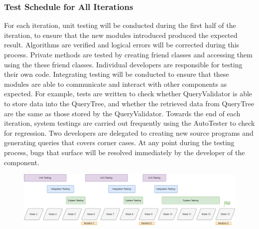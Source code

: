 \documentclass[12pt]{article}
\begin{document}
{{{{{{{{{{{{{\subsubsection{Test Schedule for All Iterations}
For each iteration, unit testing will be conducted during the first half of the iteration, to ensure that the new modules introduced produced the expected result. Algorithms are verified and logical errors will be corrected during this process. Private methods are tested by creating friend classes and accessing them using the these friend classes. Individual developers are responsible for testing their own code. Integrating testing will be conducted to ensure that these modules are able to communicate and interact with other components as expected. For example, tests are written to check whether QueryValidator is able to store data into the QueryTree, and whether the retrieved data from QueryTree are the same as those stored by the QueryValidator. Towards the end of each iteration, system testings are carried out frequently using the AutoTester to check for regression. Two developers are delegated to creating new source programs and generating queries that covers corner cases. At any point during the testing process, bugs that surface will be resolved immediately by the developer of the component.
\begin{figure}[h]
  \centering 
 \includegraphics[width=1.0\textwidth]{test_schedule.png}
\end{figure}

}}}}}}}}}}}}}
\end{document}
